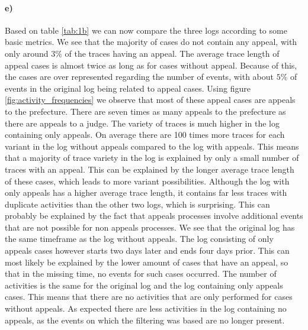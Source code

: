 \documentclass[12pt]{report}
\begin{document}
\paragraph{\textbf{e)}}

Based on table \ref{tab:1b} we can now compare the three logs according to some basic metrics. We see that the majority of
cases do not contain any appeal, with only around $3\%$ of the traces having an appeal. The average trace length of appeal cases is almost twice as long as for cases without appeal. Because of this, the cases are over represented regarding the number of events, with about $5\%$ of events in the original log being related to appeal cases. Using figure \ref{fig:activity_frequencies} we observe that most of these appeal cases are appeals to the prefecture. There are seven times as many appeals to the prefecture as there are appeals to a judge.  The variety of traces is much higher in the log containing only appeals. On average there are 100 times more traces for each variant in the log without appeals compared to the log with appeals. This means that a majority of trace variety in the log is explained by only a small number of traces with an appeal. This can be explained by the longer average trace length of these cases, which leads to more variant possibilities. Although the log with only appeals has a higher average trace length, it contains far less traces with duplicate activities than the other two logs, which is surprising. This can probably be explained by the fact that appeals processes involve additional events that are not possible for non appeals processes. We see that the original log has the same timeframe as the log without appeals. The log consisting of only appeals cases however starts two days later and ends four days prior. This can most likely be explained by the lower amount of cases that have an appeal, so that in the missing time, no events for such cases occurred. The number of activities is the same for the original log and the log containing only appeals cases. This means that there are no activities that are only performed for cases without appeals. As expected there are less activities in the log containing no appeals, as the events on which the filtering was based are no longer present.
\end{document}
